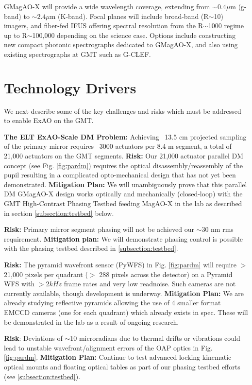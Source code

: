 \documentclass[12pt,preprint]{aastex}
\begin{document}
GMagAO-X will provide a wide wavelength coverage, extending from $\sim 0.4 \mu$m (g-band) to $\sim 2.4 \mu$m (K-band).  Focal planes will include broad-band (R$\sim$10) imagers, and fiber-fed IFUS offering spectral resolution from the R$\sim$1000 regime up to R$\sim$100,000 depending on the science case. Options include constructing new compact photonic spectrographs dedicated to GMagAO-X, and also using existing spectrographs at GMT such as G-CLEF.

\section{Technology Drivers} 

We next describe some of the key challenges and risks which must be addressed to enable ExAO on the GMT.

\textbf{The ELT ExAO-Scale DM Problem:} Achieving ~13.5 cm projected sampling of the primary mirror requires ~3000 actuators per 8.4 m segment, a total of 21,000 actuators on the GMT segments. \textbf{Risk:} Our 21,000 actuator parallel DM concept (see Fig. \ref{fig:pardm}) requires the optical disassembly/reassembly of the pupil resulting in a complicated opto-mechanical design that has not yet been demonstrated. \textbf{Mitigation Plan:} We will unambiguously prove that this parallel DM GMagAO-X design works optically and mechanically (closed-loop) with the GMT High-Contrast Phasing Testbed feeding MagAO-X in the lab as described in section \ref{subsection:testbed} below. 

\textbf{Risk:} Primary mirror segment phasing will not be achieved our $\sim$30 nm rms requirement. \textbf{Mitigation plan:} We will demonstrate phasing control is possible with the phasing testbed described in \ref{subsection:testbed}. 

\textbf{Risk:} The pyramid wavefront sensor (PyWFS) in Fig. \ref{fig:pardm} will require $>$ 21,000 pixels per quadrant ($>$ 288 pixels across the detector) on a Pyramid WFS with $>2kHz$ frame rates and very low readnoise.  Such cameras are not currently available, though development is underway. \textbf{Mitigation Plan:}  We are already studying reflective pyramids allowing the use of 4 smaller format EMCCD cameras (one for each quadrant) which already exists in spec. These will be demonstrated in the lab as a result of ongoing research.

\textbf{Risk}: Deviations of $\sim10$ microradians due to thermal drifts or vibrations could lead to unstable wavefront/alignment errors of the OAP optics in Fig. \ref{fig:pardm}. \textbf{Mitigation Plan:} Continue to test advanced locking kinematic optical mounts and floating optical tables as part of our phasing testbed efforts (see \ref{subsection:testbed}).
\end{document}
